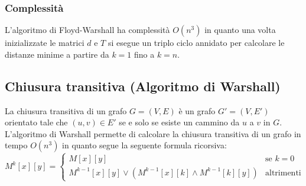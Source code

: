         \subsubsection{Complessità}
            L'algoritmo di Floyd-Warshall ha complessità $O(n^3)$ in quanto una volta inizializzate le matrici $d$ e $T$ si esegue un triplo ciclo annidato per calcolare le distanze minime a partire da $k=1$ fino a $k=n$.
    \subsection{Chiusura transitiva (Algoritmo di Warshall)}
        La chiusura transitiva di un grafo $G=(V,E)$ è un grafo $G'=(V,E')$ orientato tale che $(u,v)\in E'$ se e solo se esiste un cammino da $u$ a $v$ in $G$. L'algoritmo di Warshall permette di calcolare la chiusura transitiva di un grafo in tempo $O(n^3)$ in quanto segue la seguente formula ricorsiva:
        $$
            M^k[x][y]=\begin{cases}
                M[x][y] & \text{se } k=0\\
                M^{k-1}[x][y] \lor (M^{k-1}[x][k] \land M^{k-1}[k][y]) & \text{altrimenti}
            \end{cases}
        $$